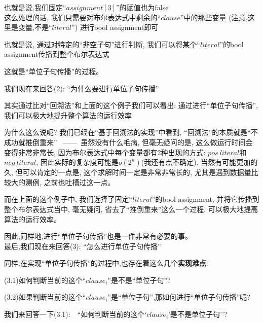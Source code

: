        \par
        也就是说,我们固定``$assignment[3]$''的赋值也为false
        \\
        这么处理的话,
        我们只需要对布尔表达式中剩余的``$clause$''中的那些变量
        (注意,这里是变量,不是``$literal$'')
        进行bool assignment即可
        \par
        也就是说,
        通过对特定的``非空子句''进行判断,
        我们可以将某个``$literal$''的bool assignment传播到整个布尔表达式
        \par
        这就是``单位子句传播''的过程。
        \newline
        \par
        \noindent
        我们现在来回答(2):   ``为什么要进行单位子句传播''
        \newline
        \par
        其实通过比对``回溯法''和上面的这个例子我们可以看出:
        通过进行``单位子句传播'',
        我们可以极大地提升整个算法的运行效率\par
        为什么这么说呢?
         我们已经在``基于回溯法的实现''中看到,
        ``回溯法''的本质就是``不成功就推倒重来''
        \ ——\ 
        虽然没有什么毛病,
        但毫无疑问的是,
        这么做运行时间会变得非常非常长,
        因为布尔表达式中每个变量都有2种出现的方式:
        $pos\ literal$和$neg\ literal$,
        因此实际的复杂度可能是$o(2^{n})$(我还有点不确定),
        当然有可能更加的久,
        但可以肯定的一点是,
        这个求解时间一定是非常非常长的,
        尤其是遇到数据量比较大的测例,
        之前也吐槽过这一点。
        \par
        而在上面的这个例子中,
        我们选择了固定``$literal$''的bool assignment,
        并将它传播到整个布尔表达式当中,
        毫无疑问,
        省去了``推倒重来''这么一个过程,
        可以极大地提高算法的运行效率。
        \par
        因此,同样地,进行``单位子句传播''也是一件非常有必要的事。\\
        \newline
        \noindent
        最后,我们现在来回答(3):   ``怎么进行单位子句传播''
        \newline
        \par
        同样,在实现``单位子句传播''的过程中,也存在着这么几个\textbf{实现难点}:
        \newline
        \par
            (3.1)如何判断当前的这个``$clause_{i}$''是不是``单位子句''?\par
            (3.2)如果判断当前的这个``$clause_{i}$''是``单位子句'',那如何进行``单位子句传播''呢?\\
        \par
        我们来回答一下(3.1):$\quad$``如何判断当前的这个`$clause_{i}$'是不是单位子句''?
        \\

